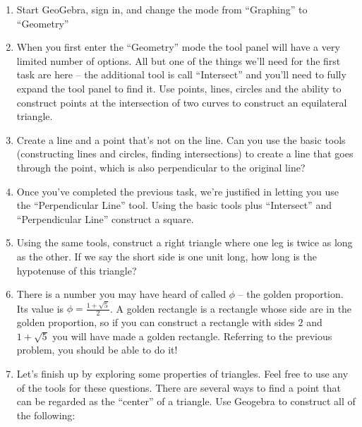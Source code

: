 \begin{enumerate}

\item Start GeoGebra, sign in, and change the mode from ``Graphing'' to ``Geometry''

\vfill

\item When you first enter the ``Geometry'' mode the tool panel will have a very limited number of options.  All but one of the things we'll need for the first task are here -- the additional tool is call ``Intersect'' and you'll need to fully expand the tool panel to find it.  Use points, lines, circles and the ability to construct points at the intersection of two curves to construct an equilateral triangle.

\vfill

\item Create a line and a point that's not on the line.  Can you use the basic tools (constructing lines and circles, finding intersections) to create a line that goes through the point, which is also perpendicular to the original line?

\vfill

\item Once you've completed the previous task, we're justified in letting you use the ``Perpendicular Line'' tool.  Using the basic tools plus ``Intersect'' and ``Perpendicular Line'' construct a square.

\vfill

\item Using the same tools, construct a right triangle where one leg is twice as long as the other.  If we say the short side is one unit long, how long is the hypotenuse of this triangle?

\vfill

\item There is a number you may have heard of called $\phi$ -- the golden proportion.  Its value is $\displaystyle \phi = \frac{1+\sqrt{5}}{2}$.
A golden rectangle is a rectangle whose side are in the golden proportion, so if you can construct a rectangle with sides $2$ and $1+\sqrt{5}$ you will have made a golden rectangle.  Referring to the previous problem, you should be able to do it!

\vfill

\newpage

\item Let's finish up by exploring some properties of triangles.  Feel free to use any of the tools for these questions.
There are several ways to find a point that can be regarded as the ``center'' of a triangle.  Use Geogebra to construct all of the following:


\end{enumerate}
